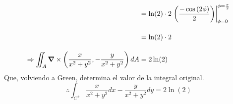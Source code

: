 \begin{solution}
\begin{align*}
        &= \ln(2)\cdot 2\left.\left(\frac{-\cos{(2\phi)}}{2}\right)\right|^{\phi=\frac{\pi}{2}}_{\phi=0}\\[10pt]
        &= \ln(2)\cdot 2\\[10pt]
        \Rightarrow \iint_{A} \grad \times \left(\frac{x}{x^2+y^2},-\frac{y}{x^2+y^2}\right)dA &= 2\ln(2)
    \end{align*}
    Que, volviendo a Green, determina el valor de la integral original.
    \begin{equation*}
         \therefore \int_{C^+} \frac{x}{x^2+y^2}dx - \frac{y}{x^2+y^2}dy = 2\ln(2)
    \end{equation*}
\end{solution}